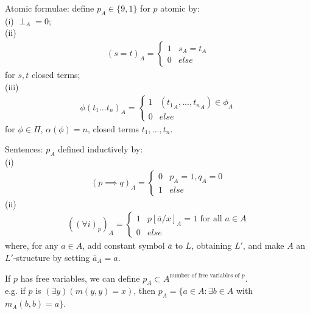 \documentclass[a4paper]{article}
\begin{document}
Atomic formulae: define $p_A \in \{9,1\}$ for $p$ atomic by:\\
(i) $\perp_A = 0$;\\
(ii) 
\begin{equation*}
\begin{aligned}
(s=t)_A = \left\{\begin{array}{ll}
1 & s_A = t_A\\
0 & else
\end{array}
\right.
\end{aligned}
\end{equation*}
for $s,t$ closed terms;\\
(iii) 
\begin{equation*}
\begin{aligned}
\phi(t_1...t_n)_A = \left\{\begin{array}{ll}
1 & ({t_1}_A,...,{t_n}_A) \in \phi_A\\
0 & else
\end{array}
\right.
\end{aligned}
\end{equation*}
for $\phi \in \Pi$, $\alpha(\phi) = n$, closed terms $t_1,...,t_n$.

Sentences: $p_A$ defined inductively by:\\
(i)
\begin{equation*}
\begin{aligned}
(p \implies q)_A =\left\{\begin{array}{ll}
0 & p_A=1,q_A=0\\
1 & else
\end{array}
\right.
\end{aligned}
\end{equation*}
(ii)
\begin{equation*}
\begin{aligned}
((\forall i)_p)_A =\left\{\begin{array}{ll}
1 & p[\bar{a}/x]_A = 1 \text{ for all } a \in A\\
0 & else
\end{array}
\right.
\end{aligned}
\end{equation*}
where, for any $a \in A$, add constant symbol $\bar{a}$ to $L$, obtaining $L'$, and make $A$ an $L'$-structure by setting $\bar{a}_A = a$.

If $p$ has free variables, we can define $p_A \subset A^{\text{number of free variables of } p}$.\\
e.g. if $p$ is $(\exists y)(m(y,y) = x)$, then $p_A = \{a \in A: \exists b \in A$ with $m_A(b,b) = a\}$.
\end{document}
